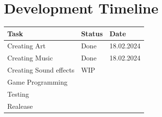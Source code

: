 \documentclass[12pt, a4paper]{article}
\begin{document}
{    \section{Development Timeline}
        \begin{table}[h]
            \centering
            \begin{tabular}{| m{4cm} | m{4cm} | m{4cm}|}\hline
                \textbf{Task} & \textbf{Status} & \textbf{Date}\\\hline\hline
                Creating Art & Done & 18.02.2024\\\hline
                Creating Music & Done & 18.02.2024\\\hline
                Creating Sound effects & WIP &\\\hline
                Game Programming  &  & \\\hline
                Testing & & \\\hline
                Realease & & \\\hline
            \end{tabular}
        \end{table}
}
\end{document}
